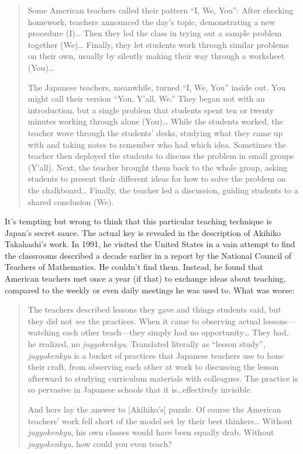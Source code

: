 \begin{quotation}   %
Some American teachers called their pattern ``I, We, You'':
After checking homework,
teachers announced the day's topic,
demonstrating a new procedure (I)\ldots{}
Then they led the class in trying out a sample problem together (We)\ldots{}
Finally, they let students work through similar problems on their own,
usually by silently making their way through a worksheet (You)\ldots{}

The Japanese teachers, meanwhile, turned ``I, We, You'' inside out.
You might call their version ``You, Y'all, We.''
They began not with an
introduction,
but a single problem that students spent ten or twenty
minutes working through alone (You)\ldots{}
While the students worked,
the teacher wove through the students' desks,
studying what they came up with and taking notes to remember who had which idea.
Sometimes the teacher then deployed the students to discuss the problem in small
groups (Y'all).
Next, the teacher brought them back to the whole group,
asking students to present their different ideas for how to solve the problem on the chalkboard\ldots{}
Finally, the teacher led a discussion,
guiding students to a shared conclusion (We).
\end{quotation}   %

It's tempting but wrong to think that this particular teaching technique is Japan's secret sauce.
The actual key is revealed in the description of Akihiko Takahashi's work.
In 1991,
he visited the United States in a vain attempt to find the classrooms described a decade earlier
in a report by the National Council of Teachers of Mathematics.
He couldn't find them.
Instead, he found that American teachers met once a year (if that) to exchange ideas about teaching,
compared to the weekly or even daily meetings he was used to.
What was worse:

\begin{quotation}   %
The teachers described lessons they gave and things students said,
but they did not \emph{see} the practices.
When it came to observing actual lessons---watching each other teach---they
simply had no opportunity\ldots{}
They had, he realized, no \emph{jugyokenkyu}.
Translated literally as ``lesson study'',
\emph{jugyokenkyu} is a bucket of practices that Japanese teachers use to hone their craft,
from observing each other at work to discussing the lesson afterward
to studying curriculum materials with colleagues.
The practice is so pervasive in Japanese schools that it is\ldots{}effectively invisible.

And here lay the answer to [Akihiko's] puzzle.
Of course the American teachers' work fell short of the model set by their best thinkers\ldots{}
Without \emph{jugyokenkyu}, his own classes would have been equally drab.
Without \emph{jugyokenkyu}, how could you even teach?
\end{quotation}   %

